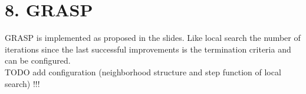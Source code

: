 \section*{8. GRASP}
GRASP is implemented as proposed in the slides. Like local search the number of iterations since the last successful improvements is the termination criteria and can be configured. \\ 
TODO add configuration (neighborhood structure and step function of local search) !!!